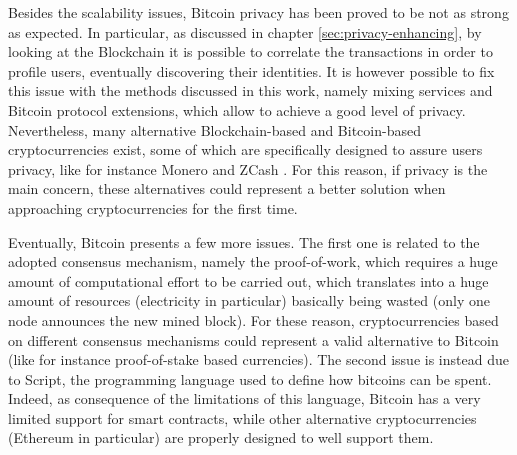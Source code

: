 Besides the scalability issues, Bitcoin privacy has been proved to be not as strong as expected. In particular, as discussed in chapter \ref{sec:privacy-enhancing}, by looking at the Blockchain it is possible to correlate the transactions in order to profile users, eventually discovering their identities. It is however possible to fix this issue with the methods discussed in this work, namely mixing services and Bitcoin protocol extensions, which allow to achieve a good level of privacy. Nevertheless, many alternative Blockchain-based and Bitcoin-based cryptocurrencies exist, some of which are specifically designed to assure users privacy, like for instance Monero \cite{getmonero} and ZCash \cite{zcash}. For this reason, if privacy is the main concern, these alternatives could represent a better solution when approaching cryptocurrencies for the first time. 

Eventually, Bitcoin presents a few more issues. The first one is related to the adopted consensus mechanism, namely the proof-of-work, which requires a huge amount of computational effort to be carried out, which translates into a huge amount of resources (electricity in particular) basically being wasted (only one node announces the new mined block). For these reason, cryptocurrencies based on different consensus mechanisms could represent a valid alternative to Bitcoin (like for instance proof-of-stake based currencies). The second issue is instead due to Script, the programming language used to define how bitcoins can be spent. Indeed, as consequence of the limitations of this language, Bitcoin has a very limited support for smart contracts, while other alternative cryptocurrencies (Ethereum \cite{ethereum} in particular) are properly designed to well support them. 
